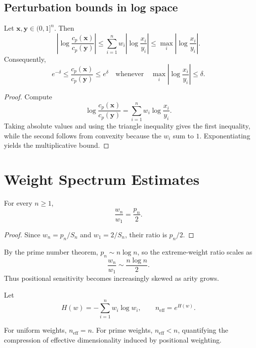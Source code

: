 \documentclass[11pt]{article}
\begin{document}
\subsection{Perturbation bounds in log space}
\begin{theorem}
Let $\mathbf{x},\mathbf{y}\in(0,1]^n$. Then
\[
\left|\log \frac{c_p(\mathbf{x})}{c_p(\mathbf{y})}\right|
\le \sum_{i=1}^n w_i\left|\log \frac{x_i}{y_i}\right|
\le \max_i \left|\log \frac{x_i}{y_i}\right|.
\]
Consequently,
\[
 e^{-\delta} \le \frac{c_p(\mathbf{x})}{c_p(\mathbf{y})} \le e^{\delta}
 \quad \text{whenever} \quad
 \max_i \left|\log \frac{x_i}{y_i}\right| \le \delta.
\]
\end{theorem}
\begin{proof}
Compute
\[
\log \frac{c_p(\mathbf{x})}{c_p(\mathbf{y})}
= \sum_{i=1}^n w_i \log\frac{x_i}{y_i}.
\]
Taking absolute values and using the triangle inequality gives the first inequality, while the second follows from convexity because the $w_i$ sum to $1$. Exponentiating yields the multiplicative bound.
\end{proof}

\section{Weight Spectrum Estimates}
\begin{proposition}
For every $n\ge1$,
\[
\frac{w_n}{w_1} = \frac{p_n}{2}.
\]
\end{proposition}
\begin{proof}
Since $w_n=p_n/S_n$ and $w_1=2/S_n$, their ratio is $p_n/2$.
\end{proof}

\begin{remark}
By the prime number theorem, $p_n \sim n\log n$, so the extreme-weight ratio scales as
\[
\frac{w_n}{w_1} \sim \frac{n\log n}{2}.
\]
Thus positional sensitivity becomes increasingly skewed as arity grows.
\end{remark}

\begin{definition}
Let
\[
H(w) = -\sum_{i=1}^n w_i \log w_i,
\qquad
n_{\mathrm{eff}} = e^{H(w)}.
\]
\end{definition}

\begin{remark}
For uniform weights, $n_{\mathrm{eff}}=n$. For prime weights, $n_{\mathrm{eff}}<n$, quantifying the compression of effective dimensionality induced by positional weighting.
\end{remark}
\end{document}
